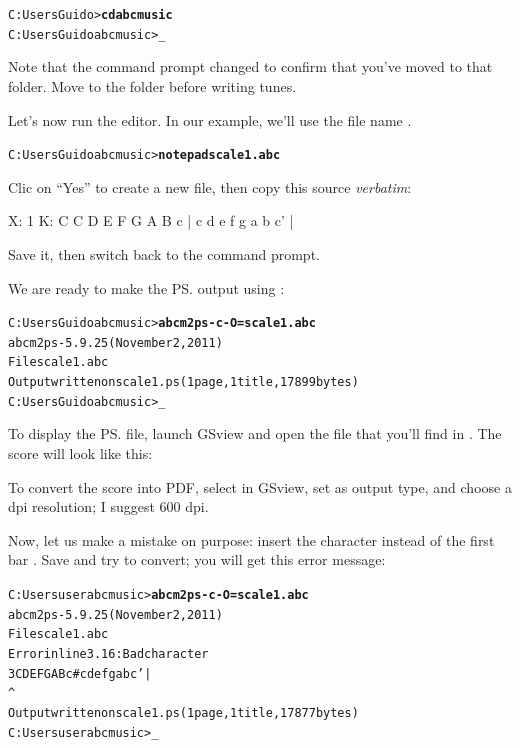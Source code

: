 \documentclass[a4paper,fullpage,12pt]{book}
\begin{document}
\begin{alltt}
C:\bl{}Users\bl{}Guido>\textbf{cd abcmusic}
C:\bl{}Users\bl{}Guido\bl{}abcmusic>_
\end{alltt}

Note that the command prompt changed to confirm that you've moved to
that folder. Move to the  folder before writing tunes.

Let's now run the  editor. In our example, we'll use the
file name .

\begin{alltt}
C:\bl{}Users\bl{}Guido\bl{}abcmusic>\textbf{notepad scale1.abc}
\end{alltt}

Clic on ``Yes'' to create a new file, then copy this source 
\emph{verbatim}:

\begin{abcsource}
X: 1 %
K: C %
C D E F G A B c | c d e f g a b c' |
\end{abcsource}

Save it, then switch back to the command prompt.

We are ready to make the \ps{} output using \abcm:

\begin{alltt}
C:\bl{}Users\bl{}Guido\bl{}abcmusic>\textbf{abcm2ps -c -O= scale1.abc}
abcm2ps-5.9.25 (November 2, 2011)
File scale1.abc
Output written on scale1.ps (1 page, 1 title, 17899 bytes)
C:\bl{}Users\bl{}Guido\bl{}abcmusic>_
\end{alltt}

To display the \ps{} file, launch GSview and open the 
file that you'll find in . The score will look like this:

\medskip


\medskip

To convert the score into PDF, select  in
GSview, set  as output type, and choose a dpi
resolution; I suggest 600 dpi.

Now, let us make a mistake on purpose: insert the \car{\#} character
instead of the first bar \car{\textbar}. Save and try to convert; you
will get this error message:

\begin{alltt}
C:\bl{}Users\bl{}user\bl{}abcmusic>\textbf{abcm2ps -c -O= scale1.abc}
abcm2ps-5.9.25 (November 2, 2011)
File scale1.abc
Error in line 3.16: Bad character
   3 C D E F G A B c # c d e f g a b c' |
                     ^
Output written on scale1.ps (1 page, 1 title, 17877 bytes)
C:\bl{}Users\bl{}user\bl{}abcmusic>_
\end{alltt}
\end{document}
